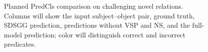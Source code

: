 \begin{figure}[t]
\centering
{}
\caption{Planned PredCls comparison on challenging novel relations. Columns will show the input subject--object pair, ground truth, SDSGG prediction, predictions without VSP and NS, and the full-model prediction; color will distinguish correct and incorrect predicates.}
\label{fig:challenging_cases}
\end{figure}
